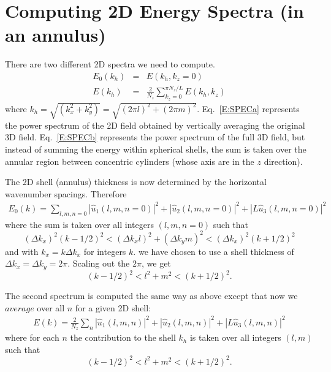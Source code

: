 \documentclass[12pt]{article}
\begin{document}
\section{Computing 2D Energy Spectra (in an annulus)}
There are two different 2D spectra we need to compute. 
\begin{eqnarray}
E_0(k_h) &=& E(k_h, k_z=0) 
\label{E:SPECa} \\
E(k_h) &=& \frac{2}{N_z}\sum_{k_z=0}^{\pi N_z/L} E(k_h,k_z) 
\label{E:SPECb}
\end{eqnarray}
where $k_h = \sqrt{(k_x^2 + k_y^2)} = \sqrt{(2\pi l)^2 + (2\pi m)^2}$. 
Eq.~\ref{E:SPECa} represents the power spectrum of the 2D field
obtained by vertically averaging the original 3D field.
Eq.~\ref{E:SPECb} represents
the power spectrum of the full 3D field, but instead of 
summing the energy within spherical shells, the sum is
taken over the annular region between concentric cylinders
(whose axis are in the $z$ direction).


The 2D shell (annulus) thickness is now
determined by the horizontal wavenumber spacings. Therefore 
\begin{eqnarray*}
E_0(k) = \sum_{l,m,n=0}  |  {\hat u_1}(l,m,n=0) |^2 +
 |  {\hat u_2}(l,m,n=0) |^2 + 
 |  L {\hat u_3}(l,m,n=0) |^2
\end{eqnarray*}
where the sum is taken over all integers $(l,m,n=0)$ such that
\[
(\Delta k_x)^2 (k-1/2)^2 < (\Delta k_x l)^2 + (\Delta k_y m)^2  <  (\Delta k_x)^2 (k+1/2)^2 
\]
and with $k_x=k \Delta k_x$ for integers $k$.  
we have chosen to use a shell thickness of $\Delta k_x = \Delta
k_y = 2\pi$. Scaling out the $2\pi$, we get
\[
(k-1/2)^2 < l^2 + m^2 < (k+1/2)^2.
\]  

The second spectrum is computed the same way as above except that now
we $average$ over all $n$ for a given 2D shell:
\begin{eqnarray}
E(k) = \frac{2}{N_z}\sum_{n}  |  {\hat u_1}(l,m,n) |^2 +
 |  {\hat u_2}(l,m,n) |^2 + 
 |  L {\hat u_3}(l,m,n) |^2
\end{eqnarray}
where for each $n$ the contribution to the shell $k_h$ is 
taken over all integers $(l,m)$ such that
\[
(k-1/2)^2 < l^2 + m^2 < (k+1/2)^2.
\]  
\end{document}

